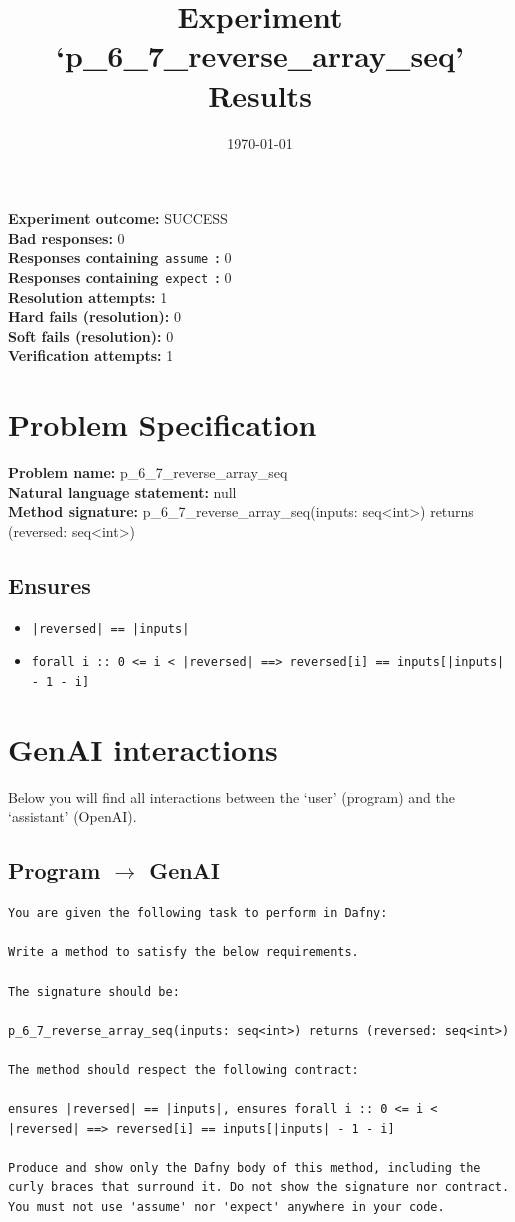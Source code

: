 \documentclass{article}
\begin{document}
\title{Experiment `p\_6\_7\_reverse\_array\_seq' Results}
\author{\today}
\date{}
\maketitle
\textbf{Experiment outcome: }SUCCESS
\\\textbf{Bad responses: }0
\\\textbf{Responses containing}~\texttt{assume}~\textbf{: }0
\\\textbf{Responses containing}~\texttt{expect}~\textbf{: }0
\\\textbf{Resolution attempts: }1
\\\textbf{Hard fails (resolution): }0
\\\textbf{Soft fails (resolution): }0
\\\textbf{Verification attempts: }1
\section*{Problem Specification}
\textbf{Problem name: }p\_6\_7\_reverse\_array\_seq
\\\textbf{Natural language statement: }null
\\\textbf{Method signature: }p\_6\_7\_reverse\_array\_seq(inputs: seq<int>) returns (reversed: seq<int>)
\subsection*{Ensures}
\begin{itemize}
\item \texttt{|reversed| == |inputs|}
\item \texttt{forall i :: 0 <= i < |reversed| ==> reversed[i] == inputs[|inputs| - 1 - i]}
\end{itemize}
\clearpage
\section*{GenAI interactions}
Below you will find all interactions between the `user' (program) and the `assistant' (OpenAI).
\subsection*{Program $\rightarrow$ GenAI}
\begin{lstlisting}
You are given the following task to perform in Dafny:

Write a method to satisfy the below requirements.

The signature should be:

p_6_7_reverse_array_seq(inputs: seq<int>) returns (reversed: seq<int>)

The method should respect the following contract:

ensures |reversed| == |inputs|, ensures forall i :: 0 <= i < |reversed| ==> reversed[i] == inputs[|inputs| - 1 - i]

Produce and show only the Dafny body of this method, including the curly braces that surround it. Do not show the signature nor contract. You must not use 'assume' nor 'expect' anywhere in your code.
\end{lstlisting}
\end{document}
